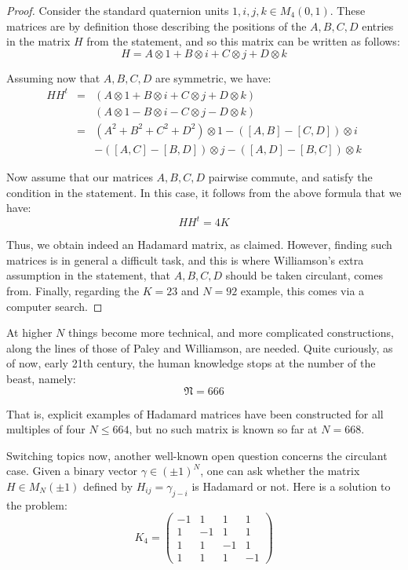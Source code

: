\documentclass[12pt]{amsbook}
\begin{document}
\begin{proof}
Consider the standard quaternion units $1,i,j,k\in M_4(0,1)$. These matrices are by definition those describing the positions of the $A,B,C,D$ entries in the matrix $H$ from the statement, and so this matrix can be written as follows:
$$H=A\otimes 1+B\otimes i+C\otimes j+D\otimes k$$

Assuming now that $A,B,C,D$ are symmetric, we have:
\begin{eqnarray*}
HH^t
&=&(A\otimes 1+B\otimes i+C\otimes j+D\otimes k)\\
&&(A\otimes 1-B\otimes i-C\otimes j-D\otimes k)\\
&=&(A^2+B^2+C^2+D^2)\otimes 1-([A,B]-[C,D])\otimes i\\
&&-([A,C]-[B,D])\otimes j-([A,D]-[B,C])\otimes k
\end{eqnarray*}

Now assume that our matrices $A,B,C,D$ pairwise commute, and satisfy the condition in the statement. In this case, it follows from the above formula that we have:
$$HH^t=4K$$

Thus, we obtain indeed an Hadamard matrix, as claimed. However, finding such matrices is in general a difficult task, and this is where Williamson's extra assumption in the statement, that $A,B,C,D$ should be taken circulant, comes from. Finally, regarding the $K=23$ and $N=92$ example, this comes via a computer search. 
\end{proof}

At higher $N$ things become more technical, and more complicated constructions, along the lines of those of Paley and Williamson, are needed. Quite curiously, as of now, early 21th century, the human knowledge stops at the number of the beast, namely:
$$\mathfrak N=666$$

That is, explicit examples of Hadamard matrices have been constructed for all multiples of four $N\leq 664$, but no such matrix is known so far at $N=668$. 

\bigskip

Switching topics now, another well-known open question concerns the circulant case. Given a binary vector $\gamma\in(\pm 1)^N$, one can ask whether the matrix $H\in M_N(\pm 1)$ defined by $H_{ij}=\gamma_{j-i}$ is Hadamard or not. Here is a solution to the problem:
$$K_4=\begin{pmatrix}-1&1&1&1\\ 1&-1&1&1\\ 1&1&-1&1\\ 1&1&1&-1\end{pmatrix}$$
\end{document}

